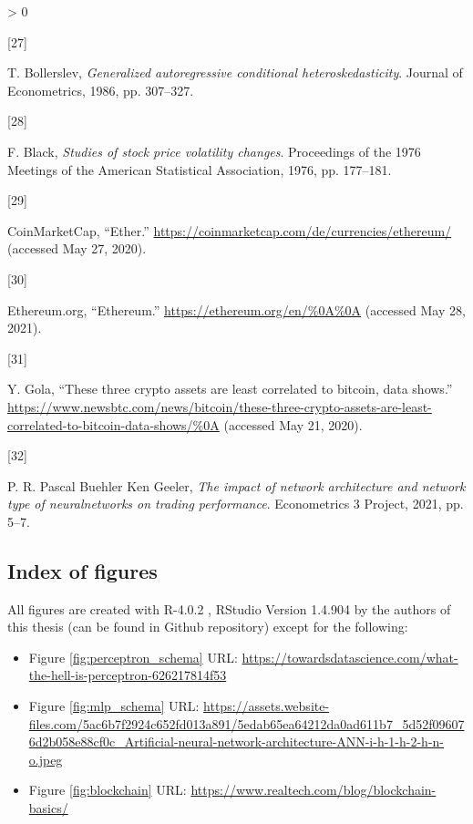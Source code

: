 \documentclass[
]{article}
\newlength{\cslhangindent}
\newlength{\csllabelwidth}
\newenvironment{CSLReferences}[2] %
 {%
  \setlength{\parindent}{0pt}
  \ifodd #1 \everypar{\setlength{\hangindent}{\cslhangindent}}\ignorespaces\fi
  \ifnum #2 > 0
  \setlength{\parskip}{#2\baselineskip}
  \fi
 }%
 {}
\newcommand{\CSLLeftMargin}[1]{\parbox[t]{\csllabelwidth}{#1}}
\newcommand{\CSLRightInline}[1]{\parbox[t]{\linewidth - \csllabelwidth}{#1}\break}
\begin{document}
\begin{CSLReferences}{0}{0}
\leavevmode\hypertarget{ref-garch}{}%
\CSLLeftMargin{{[}27{]} }
\CSLRightInline{T. Bollerslev, \emph{Generalized autoregressive
conditional heteroskedasticity}. Journal of Econometrics, 1986, pp.
307--327.}

\leavevmode\hypertarget{ref-leverage_effect}{}%
\CSLLeftMargin{{[}28{]} }
\CSLRightInline{F. Black, \emph{Studies of stock price volatility
changes}. Proceedings of the 1976 Meetings of the American Statistical
Association, 1976, pp. 177--181.}

\leavevmode\hypertarget{ref-ether}{}%
\CSLLeftMargin{{[}29{]} }
\CSLRightInline{CoinMarketCap, {``Ether.''}
\url{https://coinmarketcap.com/de/currencies/ethereum/} (accessed May
27, 2020).}

\leavevmode\hypertarget{ref-ethereum}{}%
\CSLLeftMargin{{[}30{]} }
\CSLRightInline{Ethereum.org, {``Ethereum.''}
\url{https://ethereum.org/en/\%0A\%0A} (accessed May 28, 2021).}

\leavevmode\hypertarget{ref-correlation_btc}{}%
\CSLLeftMargin{{[}31{]} }
\CSLRightInline{Y. Gola, {``These three crypto assets are least
correlated to bitcoin, data shows.''}
\url{https://www.newsbtc.com/news/bitcoin/these-three-crypto-assets-are-least-correlated-to-bitcoin-data-shows/\%0A}
(accessed May 21, 2020).}

\leavevmode\hypertarget{ref-oeko3project}{}%
\CSLLeftMargin{{[}32{]} }
\CSLRightInline{P. R. Pascal Buehler Ken Geeler, \emph{The impact of
network architecture and network type of neuralnetworks on trading
performance}. Econometrics 3 Project, 2021, pp. 5--7.}

\end{CSLReferences}

\newpage

\hypertarget{index_of_figures}{%
\subsection{Index of figures}\label{index_of_figures}}

All figures are created with R-4.0.2 , RStudio Version 1.4.904 by the
authors of this thesis (can be found in Github repository) except for
the following:

\begin{itemize}
\item
  Figure \ref{fig:perceptron_schema} URL:
  \url{https://towardsdatascience.com/what-the-hell-is-perceptron-626217814f53}
\item
  Figure \ref{fig:mlp_schema} URL:
  \url{https://assets.website-files.com/5ac6b7f2924c652fd013a891/5edab65ea64212da0ad611b7_5d52f096076d2b058e88cf0c_Artificial-neural-network-architecture-ANN-i-h-1-h-2-h-n-o.jpeg}
\item
  Figure \ref{fig:blockchain} URL:
  \url{https://www.realtech.com/blog/blockchain-basics/}
\end{itemize}
\end{document}
